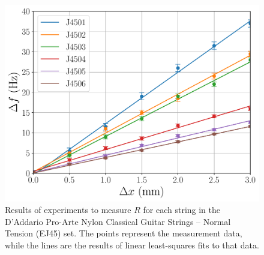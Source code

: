 \begin{figure}
  \centering
  \includegraphics[width=5.0in]{figures/fit_ej45}
  \caption{\label{fig:fit_ej45} Results of experiments to measure $R$ for each string in the D'Addario Pro-Arte Nylon Classical Guitar Strings -- Normal Tension (EJ45) set. The points represent the measurement data, while the lines are the results of linear least-squares fits to that data.}
 \end{figure}

